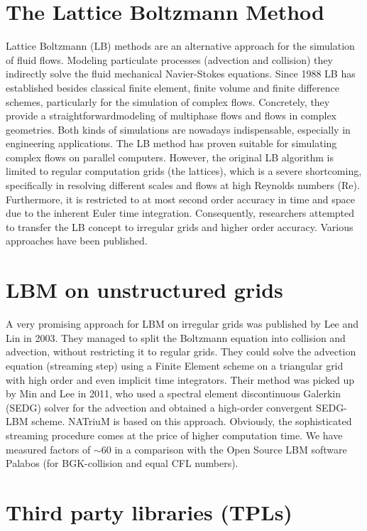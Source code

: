 \hypertarget{index_lbm_sec}{}\section{The Lattice Boltzmann Method}\label{index_lbm_sec}
Lattice Boltzmann (LB) methods are an alternative approach for the simulation of fluid flows. Modeling particulate processes (advection and collision) they indirectly solve the fluid mechanical Navier-\/Stokes equations. Since 1988 LB has established besides classical finite element, finite volume and finite difference schemes, particularly for the simulation of complex flows. Concretely, they provide a straightforwardmodeling of multiphase flows and flows in complex geometries. Both kinds of simulations are nowadays indispensable, especially in engineering applications. The LB method has proven suitable for simulating complex flows on parallel computers. However, the original LB algorithm is limited to regular computation grids (the lattices), which is a severe shortcoming, specifically in resolving different scales and flows at high Reynolds numbers (Re). Furthermore, it is restricted to at most second order accuracy in time and space due to the inherent Euler time integration. Consequently, researchers attempted to transfer the LB concept to irregular grids and higher order accuracy. Various approaches have been published.\hypertarget{index_sedg_sec}{}\section{LBM on unstructured grids}\label{index_sedg_sec}
A very promising approach for LBM on irregular grids was published by Lee and Lin in 2003. They managed to split the Boltzmann equation into collision and advection, without restricting it to regular grids. They could solve the advection equation (streaming step) using a Finite Element scheme on a triangular grid with high order and even implicit time integrators. Their method was picked up by Min and Lee in 2011, who used a spectral element discontinuous Galerkin (SEDG) solver for the advection and obtained a high-\/order convergent SEDG-\/LBM scheme. NATriuM is based on this approach. Obviously, the sophisticated streaming procedure comes at the price of higher computation time. We have measured factors of $\sim$60 in a comparison with the Open Source LBM software Palabos (for BGK-\/collision and equal CFL numbers).\hypertarget{index_tpl_sec}{}\section{Third party libraries (TPLs)}\label{index_tpl_sec}
